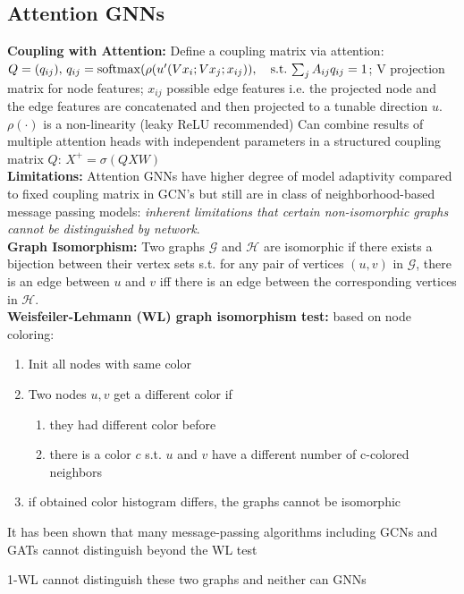 \subsection{Attention GNNs}
\textbf{Coupling with Attention: } Define a coupling matrix via attention: \(Q=(q_{ij}), \, q_{ij} = \operatorname{softmax}(\rho(u^{\prime}(Vx_i; Vx_j;  x_{ij})), \quad \text{s.t.} \, \sum_j A_{ij} q_{ij} = 1\); V projection matrix for node features; \(x_{ij}\) possible edge features i.e. the projected node and the edge features are concatenated and then projected to a tunable direction \(u\). \(\rho(\cdot)\) is a non-linearity (leaky ReLU recommended) 
Can combine results of multiple attention heads with independent parameters in a structured coupling matrix \(Q\): \(X^+ = \sigma(QXW)\)\\
\textbf{Limitations:} Attention GNNs have higher degree of model adaptivity compared to fixed coupling matrix in GCN's but still are in class of neighborhood-based message passing models: \emph{inherent limitations that certain non-isomorphic graphs cannot be distinguished by network}.\\
\textbf{Graph Isomorphism:} Two graphs $\mathcal{G}$ and $\mathcal{H}$ are isomorphic if there exists a bijection between their vertex sets s.t. for any pair of vertices $(u, v)$ in $\mathcal{G}$, there is an edge between $u$ and $v$ iff there is an edge between the corresponding vertices in $\mathcal{H}$.\\
\textbf{Weisfeiler-Lehmann (WL) graph isomorphism test:} based on node coloring:
\begin{enumerate}
    \item Init all nodes with same color
    \item Two nodes \(u, v\) get a different color if 
    \begin{enumerate}
        \item they had different color before
        \item there is a color \(c\) s.t. \(u\) and \(v\) have a different number of c-colored neighbors
    \end{enumerate}
    \item if obtained color histogram differs, the graphs cannot be isomorphic
\end{enumerate}
It has been shown that many message-passing algorithms including GCNs and GATs cannot distinguish beyond the WL test

1-WL cannot distinguish these two graphs and neither can GNNs

